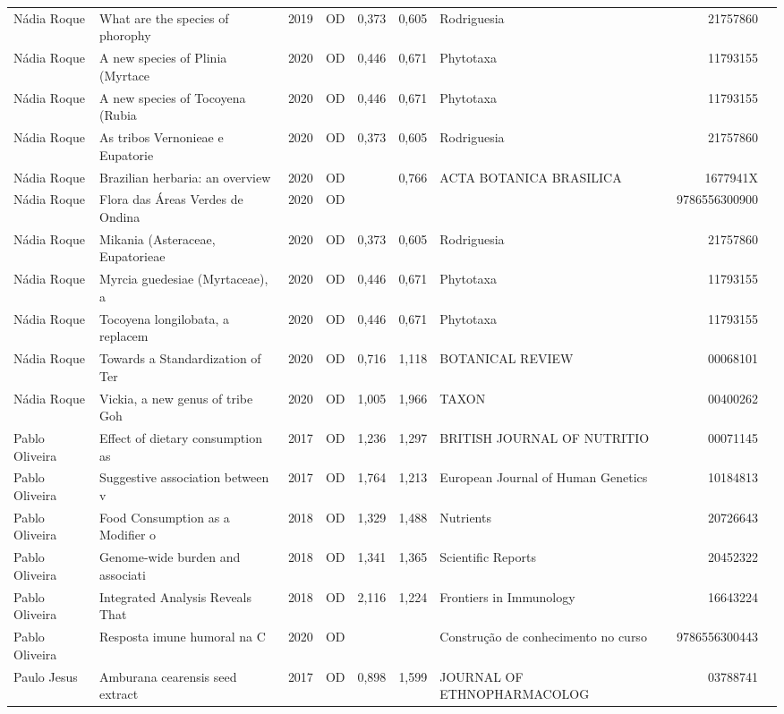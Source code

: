 \documentclass[12pt,brazil]{article}\usepackage[]{graphicx}\usepackage[]{xcolor}
\begin{document}
\begin{longtable}{lllrrllrr}
Nádia Roque & What are the species of phorophy & 2019 & OD & 0,373 & 0,605 & Rodriguesia & 21757860 \\
Nádia Roque & A new species of Plinia (Myrtace & 2020 & OD & 0,446 & 0,671 & Phytotaxa & 11793155 \\
Nádia Roque & A new species of Tocoyena (Rubia & 2020 & OD & 0,446 & 0,671 & Phytotaxa & 11793155 \\
Nádia Roque & As tribos Vernonieae e Eupatorie & 2020 & OD & 0,373 & 0,605 & Rodriguesia & 21757860 \\
Nádia Roque & Brazilian herbaria: an overview & 2020 & OD &  & 0,766 & ACTA BOTANICA BRASILICA & 1677941X \\
Nádia Roque & Flora das Áreas Verdes de Ondina & 2020 & OD &  &  &  & 9786556300900 \\
Nádia Roque & Mikania (Asteraceae, Eupatorieae & 2020 & OD & 0,373 & 0,605 & Rodriguesia & 21757860 \\
Nádia Roque & Myrcia guedesiae (Myrtaceae), a  & 2020 & OD & 0,446 & 0,671 & Phytotaxa & 11793155 \\
Nádia Roque & Tocoyena longilobata, a replacem & 2020 & OD & 0,446 & 0,671 & Phytotaxa & 11793155 \\
Nádia Roque & Towards a Standardization of Ter & 2020 & OD & 0,716 & 1,118 & BOTANICAL REVIEW & 00068101 \\
Nádia Roque & Vickia, a new genus of tribe Goh & 2020 & OD & 1,005 & 1,966 & TAXON & 00400262 \\
Pablo Oliveira & Effect of dietary consumption as & 2017 & OD & 1,236 & 1,297 & BRITISH JOURNAL OF NUTRITIO & 00071145 \\
Pablo Oliveira & Suggestive association between v & 2017 & OD & 1,764 & 1,213 & European Journal of Human Genetics & 10184813 \\
Pablo Oliveira & Food Consumption as a Modifier o & 2018 & OD & 1,329 & 1,488 & Nutrients & 20726643 \\
Pablo Oliveira & Genome-wide burden and associati & 2018 & OD & 1,341 & 1,365 & Scientific Reports & 20452322 \\
Pablo Oliveira & Integrated Analysis Reveals That & 2018 & OD & 2,116 & 1,224 & Frontiers in Immunology & 16643224 \\
Pablo Oliveira & Resposta imune humoral na C & 2020 & OD &  &  & Construção de conhecimento no curso  & 9786556300443 \\
\rowcolor{coautr}\rowcolor{coautr}\rowcolor{coautr}\rowcolor{coautr}\rowcolor{coautr}\rowcolor{coautr}\rowcolor{coautr}\rowcolor{coautr}\rowcolor{coautr}\rowcolor{coautr}\rowcolor{coautr}\rowcolor{coautr}\rowcolor{coautr}\rowcolor{coautr}\rowcolor{coautr}\rowcolor{coautr}Paulo Jesus & Amburana cearensis  seed extract & 2017 & OD & 0,898 & 1,599 & JOURNAL OF ETHNOPHARMACOLOG & 03788741 \\

\end{longtable}
\end{document}
